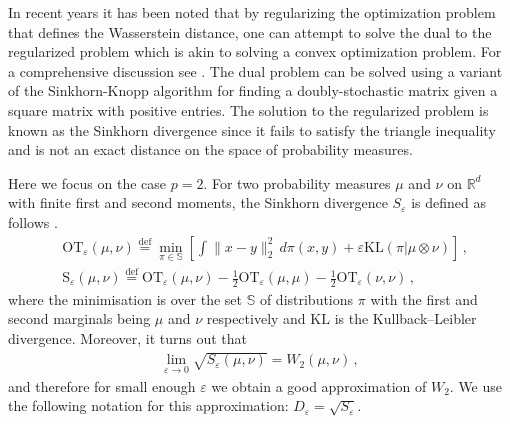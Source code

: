 In recent years it has been noted that by regularizing the optimization problem that defines the Wasserstein distance, one can attempt to solve the dual to the regularized problem which is akin to solving a convex optimization problem. For a comprehensive discussion see \cite{genevay2019entropy}. The dual problem can be solved using a variant of the Sinkhorn-Knopp algorithm for finding a doubly-stochastic matrix given a square matrix with positive entries. The solution to the regularized problem is known as the Sinkhorn divergence since it fails to satisfy the triangle inequality and is not an exact distance on the space of probability measures.

{\color{mypink}Here we focus on the case $p=2$.} For two probability measures $\mu$ and $\nu$ on $\mathbb R^d$ with finite first and second moments, the Sinkhorn divergence $S_\varepsilon$ is defined as follows \cite{feydy2019interpolating}.
\begin{align}
    &\text{OT}_\varepsilon(\mu, \nu) \stackrel{\text{def}}{=} \min_{\pi \in \mathbb{S}}\left[\int\|x-y\|_2^2\,d\pi(x, y) + \varepsilon\text{KL}(\pi|\mu\otimes\nu)\right] \,, \label{def-ot--probing-nfs}\\
    &\text{S}_\varepsilon(\mu, \nu) \stackrel{\text{def}}{=} \text{OT}_\varepsilon(\mu, \nu) -\frac{1}{2}\text{OT}_\varepsilon(\mu, \mu)-\frac{1}{2}\text{OT}_\varepsilon(\nu, \nu) \,, \label{def-sink--probing-nfs}
\end{align}
where the minimisation is over the set $\mathbb{S}$ of distributions $\pi$ with the first and second marginals being $\mu$ and $\nu$ respectively  
and $\text{KL}$ is the Kullback–Leibler divergence.
Moreover, it turns out \cite{feydy2019interpolating} that
\begin{align}
    \lim_{\varepsilon \to0}\sqrt{S_\varepsilon(\mu, \nu)} = W_2(\mu, \nu) \,,\label{eq-sinkhorn-limit--probing-nfs}
\end{align}
and therefore for small enough $\varepsilon$ we 
obtain a good approximation of $W_2$. We use the following notation for this approximation: $D_\varepsilon = \sqrt{S_\varepsilon}$.


